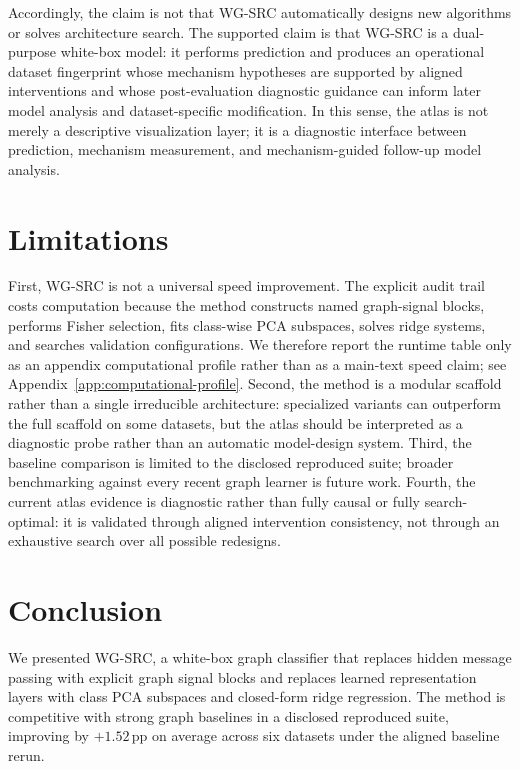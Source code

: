 \documentclass{article}
\newcommand{\SRC}{\textsc{WG-SRC}}
\newcommand{\pp}{\,\mathrm{pp}}
\begin{document}
Accordingly, the claim is not that \SRC{} automatically designs new algorithms
or solves architecture search. The supported claim is that \SRC{} is a
dual-purpose white-box model: it performs prediction and produces an
operational dataset fingerprint whose mechanism hypotheses are supported by
aligned interventions and whose post-evaluation diagnostic guidance can inform
later model analysis and dataset-specific modification. In this sense, the
atlas is not merely a descriptive visualization layer; it is a diagnostic
interface between prediction, mechanism measurement, and mechanism-guided
follow-up model analysis.



\section{Limitations}
First, \SRC{} is not a universal speed improvement. The explicit audit trail
costs computation because the method constructs named graph-signal blocks,
performs Fisher selection, fits class-wise PCA subspaces, solves ridge systems,
and searches validation configurations. We therefore report the runtime table
only as an appendix computational profile rather than as a main-text speed
claim; see Appendix~\ref{app:computational-profile}. Second, the method is a
modular scaffold rather than a single irreducible architecture: specialized
variants can outperform the full scaffold on some datasets, but the atlas
should be interpreted as a diagnostic probe rather than an automatic
model-design system. Third, the baseline comparison is limited to the disclosed
reproduced suite; broader benchmarking against every recent graph learner is
future work. Fourth, the current atlas evidence is diagnostic rather than fully
causal or fully search-optimal: it is validated through aligned intervention
consistency, not through an exhaustive search over all possible redesigns.

\section{Conclusion}
We presented \SRC, a white-box graph classifier that replaces hidden message
passing with explicit graph signal blocks and replaces learned representation
layers with class PCA subspaces and closed-form ridge regression. The method
is competitive with strong graph baselines in a disclosed reproduced suite,
improving by $+1.52\pp$ on average across six datasets under the aligned
baseline rerun.
\end{document}
